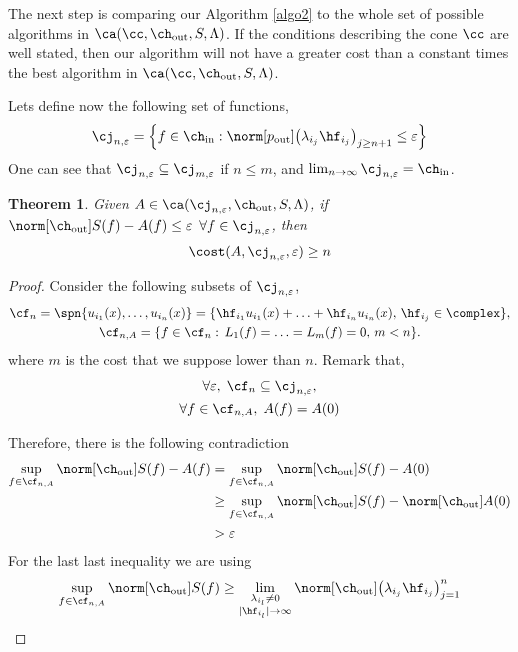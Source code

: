 \documentclass[final]{elsarticle}
\newcommand{\chin}{\ch_{\text{\rm{in}}}}
\newcommand{\chout}{\ch_{\text{\rm{out}}}}
\newcommand{\pout}{p_{\text{\rm{out}}}}
\newtheorem{theorem}{Theorem}
\theoremstyle{definition}
\theoremstyle{remark}
\begin{document}
The next step is comparing our Algorithm \ref{algo2} to the whole set of possible algorithms in $\ca(\cc,\chout,S,\Lambda)$. If the conditions describing the cone $\cc$ are well stated, then our algorithm will not have a greater cost than a constant times the best algorithm in $\ca(\cc,\chout,S,\Lambda)$.

Lets define now the following set of functions,
\begin{equation*}
\cj_{n,\varepsilon}=\left\{f\in\chin:\norm[\pout]{\left(\lambda_{i_j} \hf_{i_j} \right)_{j\ge n+1}} \le \varepsilon \right\}
\end{equation*}
One can see that $\cj_{n,\varepsilon}\subseteq\cj_{m,\varepsilon}$ if $n\le m$, and $\lim_{n\rightarrow\infty}\cj_{n,\varepsilon}=\chin$.
\begin{theorem}\label{supcost}
   Given $A\in\ca(\cj_{n,\varepsilon},\chout,S,\Lambda)$, if $\,$ $\norm[\chout]{S(f)-A(f)}\le\varepsilon$ $\forall f\in\cj_{n,\varepsilon}$, then
 \begin{equation*}
 \cost(A,\cj_{n,\varepsilon},\varepsilon)\ge n
 \end{equation*}
\end{theorem}
\begin{proof}
Consider the following subsets of $\cj_{n,\varepsilon}$,
\begin{gather*}
\cf_n=\spn\{u_{i_1}(x),\ldots,u_{i_n}(x)\}=\{\hf_{i_1}u_{i_1}(x)+\ldots+\hf_{i_n}u_{i_n}(x),\, \hf_{i_j}\in\complex\},\\
\cf_{n,A}=\{f\in\cf_n:\, L_1(f)=\ldots=L_m(f)=0,\, m<n\}.
\end{gather*}
where $m$ is the cost that we suppose lower than $n$. Remark that,
\begin{gather*}
 \forall\varepsilon,\;\cf_n\subseteq\cj_{n,\varepsilon},\\
 \forall f\in\cf_{n,A},\;A(f)=A(0)
\end{gather*}

Therefore, there is the following contradiction
\begin{align*}
\sup_{f\in\cf_{n,A}}\norm[\chout]{S(f)-A(f)}&=\sup_{f\in\cf_{n,A}}\norm[\chout]{S(f)-A(0)}\\
&\ge\sup_{f\in\cf_{n,A}}\norm[\chout]{S(f)}-\norm[\chout]{A(0)}\\
&>\varepsilon
\end{align*}
For the last last inequality we are using
\begin{equation*}
\sup_{f\in\cf_{n,A}}\norm[\chout]{S(f)}\ge\lim_{\substack{\lambda_{i_l}\neq 0 \\ |\hf_{i_l}|\rightarrow\infty}}\norm[\chout]{\left(\lambda_{i_j} \hf_{i_j} \right)_{j=1}^n}
\end{equation*}
\end{proof}
\end{document}
